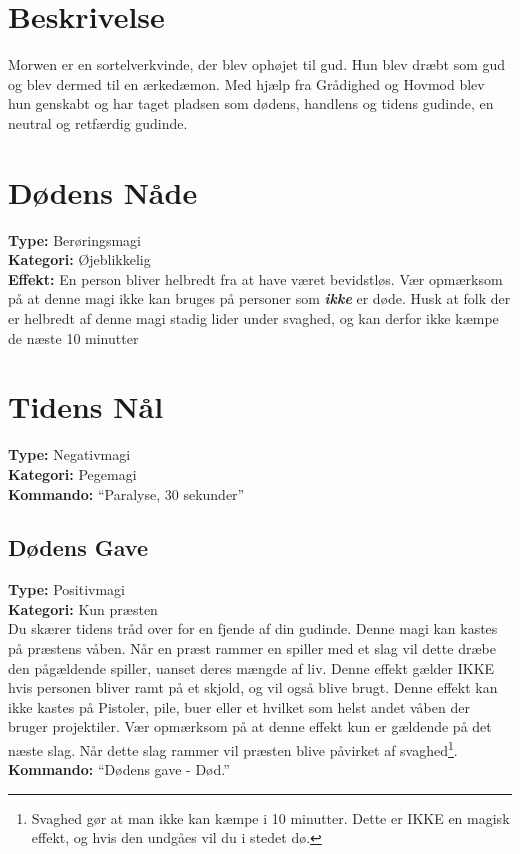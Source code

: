 \section{Beskrivelse}
Morwen er en sortelverkvinde, der blev ophøjet til gud. Hun blev dræbt som gud og blev dermed til en ærkedæmon. Med hjælp fra Grådighed og Hovmod blev hun genskabt og har taget pladsen som dødens, handlens og tidens gudinde, en neutral og retfærdig gudinde.\\

\section{Dødens Nåde}
\textbf{Type:} Berøringsmagi\\
\textbf{Kategori:} Øjeblikkelig\\
\textbf{Effekt:} En person bliver helbredt fra at have været bevidstløs. Vær opmærksom på at denne magi ikke kan bruges på personer som \textbf{\textit{ikke}} er døde. Husk at folk der er helbredt af denne magi stadig lider under svaghed, og kan derfor ikke kæmpe de næste 10 minutter

\section{Tidens Nål}
\textbf{Type:} Negativmagi\\
\textbf{Kategori:} Pegemagi\\
\textbf{Kommando:} “Paralyse, 30 sekunder”

\subsection{Dødens Gave}
\textbf{Type:} Positivmagi\\
\textbf{Kategori:} Kun præsten\\
Du skærer tidens tråd over for en fjende af din gudinde. Denne magi kan kastes på præstens våben. Når en præst rammer en spiller med et slag vil dette dræbe den pågældende spiller, uanset deres mængde af liv.
Denne effekt gælder IKKE hvis personen bliver ramt på et skjold, og vil også blive brugt. Denne effekt kan ikke kastes på Pistoler, pile, buer eller et hvilket som helst andet våben der bruger projektiler. Vær opmærksom på at denne effekt kun er gældende på det næste slag. Når dette slag rammer vil præsten blive påvirket af svaghed\footnote{Svaghed gør at man ikke kan kæmpe i 10 minutter. Dette er IKKE en magisk effekt, og hvis den undgåes vil du i stedet dø.}.\\
\textbf{Kommando:} “Dødens gave - Død.”

